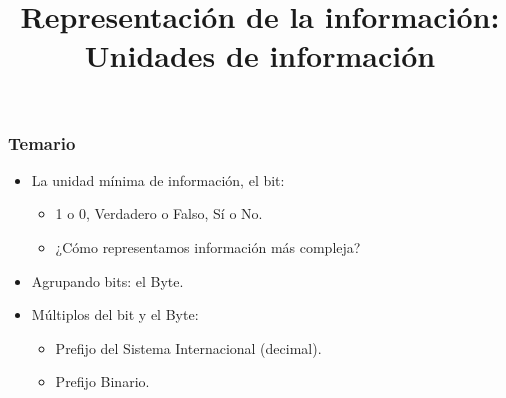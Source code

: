 \documentclass[11pt,a4paper,spanish]{beamer}
\title{Representación de la información:\\
Unidades de información}
\author{}
\date{}
\begin{document}
\begin{frame}[noframenumbering]


    \maketitle
    \centering

\end{frame}

\begin{frame}

    \frametitle{Temario}

\begin{itemize}

    \item La unidad mínima de información, el bit:
    \begin{itemize}
        \item 1 o 0, Verdadero o Falso, Sí o No.
        \item ¿Cómo representamos información más compleja?
    \end{itemize}

    \item Agrupando bits: el Byte.

    \item Múltiplos del bit y el Byte:
    \begin{itemize}
        \item Prefijo del Sistema Internacional (decimal).
        \item Prefijo Binario.
    \end{itemize}

\end{itemize}
\end{frame}
\end{document}
